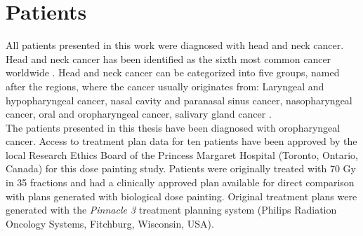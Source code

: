 
\section{Patients}
All patients presented in this work were diagnosed with head and neck cancer. Head and neck cancer has been identified as the sixth most common cancer worldwide \cite{pmid15685196}. Head and neck cancer can be categorized into five groups, named after the regions, where the cancer usually originates from: Laryngeal and hypopharyngeal cancer, nasal cavity and paranasal sinus cancer, nasopharyngeal cancer, oral and oropharyngeal cancer, salivary gland cancer \cite{Brockenstein}.\\The patients presented in this thesis have been diagnosed with oropharyngeal cancer. Access to treatment plan data for ten patients have been approved by the local Research Ethics Board of the Princess Margaret Hospital (Toronto, Ontario, Canada) for this dose painting study. Patients were originally treated with 70 Gy in 35 fractions and had a clinically approved plan available for direct comparison with plans generated with biological dose painting. Original treatment plans were generated with the \textit{Pinnacle 3} treatment planning system (Philips Radiation Oncology Systems, Fitchburg, Wisconsin, USA).

